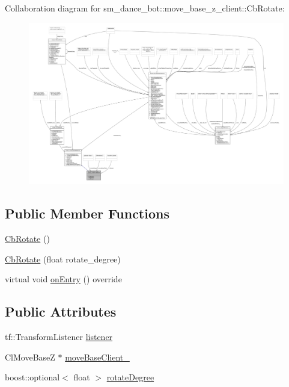 Collaboration diagram for sm\+\_\+dance\+\_\+bot\+:\+:move\+\_\+base\+\_\+z\+\_\+client\+:\+:Cb\+Rotate\+:
\nopagebreak
\begin{figure}[H]
\begin{center}
\leavevmode
\includegraphics[width=350pt]{classsm__dance__bot_1_1move__base__z__client_1_1CbRotate__coll__graph}
\end{center}
\end{figure}
\subsection*{Public Member Functions}
\begin{DoxyCompactItemize}
\item 
\hyperlink{classsm__dance__bot_1_1move__base__z__client_1_1CbRotate_aa72878751abd7de8f9895b6ecfc3e1f7}{Cb\+Rotate} ()
\item 
\hyperlink{classsm__dance__bot_1_1move__base__z__client_1_1CbRotate_ab706ef8ad745f3b293f065e3f625f6dd}{Cb\+Rotate} (float rotate\+\_\+degree)
\item 
virtual void \hyperlink{classsm__dance__bot_1_1move__base__z__client_1_1CbRotate_a61a2c0d99f36e0ce6d5b51ed4f231dca}{on\+Entry} () override
\end{DoxyCompactItemize}
\subsection*{Public Attributes}
\begin{DoxyCompactItemize}
\item 
tf\+::\+Transform\+Listener \hyperlink{classsm__dance__bot_1_1move__base__z__client_1_1CbRotate_a378ab8e6db83063793e07f8ebdae6d2c}{listener}
\item 
Cl\+Move\+BaseZ $\ast$ \hyperlink{classsm__dance__bot_1_1move__base__z__client_1_1CbRotate_ad8f923d0b85dabf481ee69b62287c028}{move\+Base\+Client\+\_\+}
\item 
boost\+::optional$<$ float $>$ \hyperlink{classsm__dance__bot_1_1move__base__z__client_1_1CbRotate_ab1ecbec2a3e65f6339d176f440e2e2f3}{rotate\+Degree}
\end{DoxyCompactItemize}


